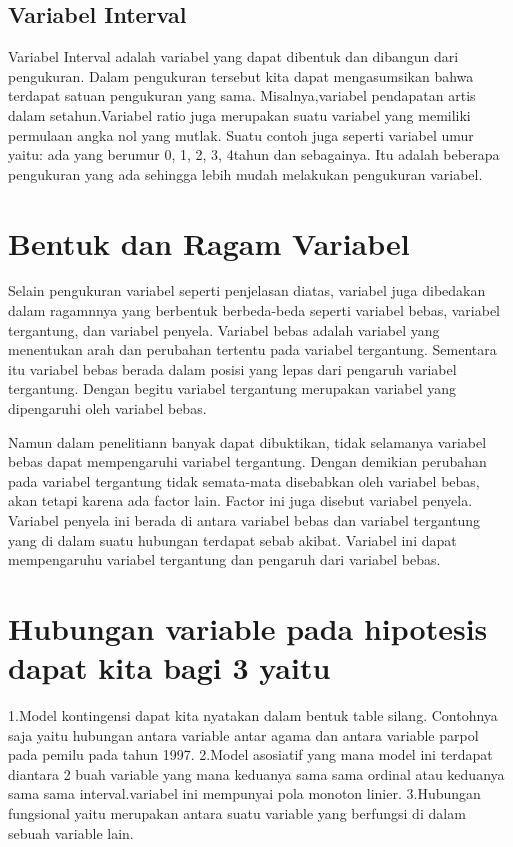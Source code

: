 \subsection{Variabel Interval}
Variabel Interval adalah variabel yang dapat dibentuk dan dibangun dari pengukuran. Dalam pengukuran tersebut kita dapat mengasumsikan 
bahwa terdapat satuan pengukuran yang sama. Misalnya,variabel pendapatan artis dalam setahun.Variabel ratio juga merupakan suatu 
variabel yang memiliki permulaan angka nol yang mutlak. Suatu contoh juga seperti variabel umur yaitu: ada yang berumur 0, 1, 2, 3, 
4tahun dan sebagainya. Itu adalah beberapa pengukuran yang ada sehingga lebih mudah melakukan pengukuran variabel.

\section{Bentuk dan Ragam Variabel}
Selain pengukuran variabel seperti penjelasan diatas, variabel juga dibedakan dalam ragamnnya yang berbentuk berbeda-beda seperti 
variabel bebas, variabel tergantung, dan variabel penyela. Variabel bebas adalah variabel yang menentukan arah dan perubahan tertentu 
pada variabel tergantung. Sementara itu variabel bebas berada dalam posisi yang lepas dari pengaruh variabel tergantung. Dengan begitu 
variabel tergantung merupakan variabel yang dipengaruhi oleh variabel bebas.

Namun dalam penelitiann banyak dapat dibuktikan, tidak selamanya variabel bebas dapat mempengaruhi variabel tergantung.
Dengan demikian perubahan pada variabel tergantung tidak semata-mata disebabkan oleh variabel bebas, akan tetapi karena ada factor lain. 
Factor ini juga disebut variabel penyela. Variabel penyela ini berada di antara variabel bebas dan variabel tergantung yang di dalam 
suatu hubungan terdapat sebab akibat. Variabel ini dapat mempengaruhu variabel tergantung  dan pengaruh dari variabel bebas.


\section{Hubungan variable pada hipotesis dapat kita bagi 3 yaitu}
1.Model kontingensi dapat kita nyatakan dalam bentuk table silang. Contohnya saja yaitu hubungan antara variable antar agama dan antara 
variable parpol pada pemilu pada tahun 1997. 
2.Model asosiatif yang mana model ini terdapat diantara 2 buah variable yang mana keduanya sama sama ordinal atau keduanya sama sama 
interval.variabel ini mempunyai pola monoton linier.
3.Hubungan fungsional yaitu merupakan antara suatu variable yang berfungsi di dalam sebuah variable lain.

